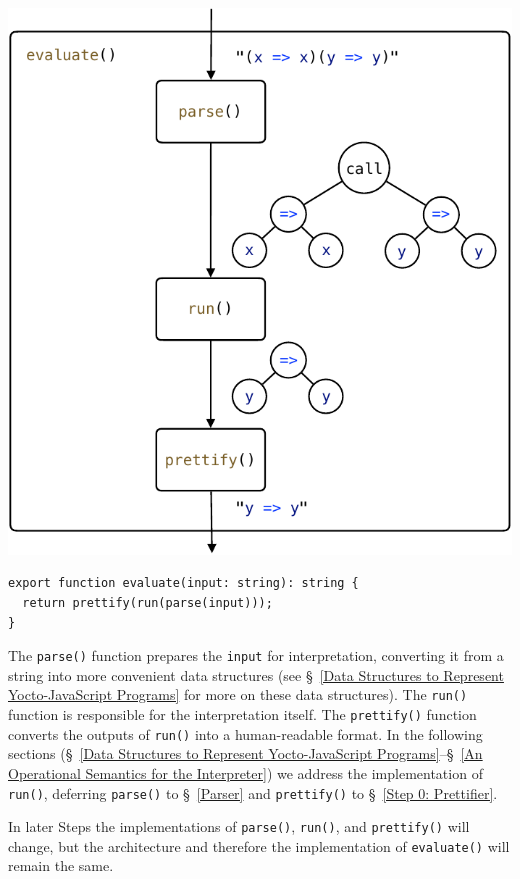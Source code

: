 \documentclass[12pt, oneside]{book}
\begin{document}
\begin{center}
\includegraphics[page = 1]{images.pdf}
\end{center}

\begin{verbatim}
export function evaluate(input: string): string {
  return prettify(run(parse(input)));
}
\end{verbatim}

The \texttt{parse()} function prepares the \texttt{input} for interpretation, converting it from a string into more convenient data structures (see §~\ref{Data Structures to Represent Yocto-JavaScript Programs} for more on these data structures). The \texttt{run()} function is responsible for the interpretation itself. The \texttt{prettify()} function converts the outputs of \texttt{run()} into a human-readable format. In the following sections (§~\ref{Data Structures to Represent Yocto-JavaScript Programs}–§~\ref{An Operational Semantics for the Interpreter}) we address the implementation of \texttt{run()}, deferring \texttt{parse()} to §~\ref{Parser} and \texttt{prettify()} to §~\ref{Step 0: Prettifier}.

In later Steps the implementations of \texttt{parse()}, \texttt{run()}, and \texttt{prettify()} will change, but the architecture and therefore the implementation of \texttt{evaluate()} will remain the same.
\end{document}
